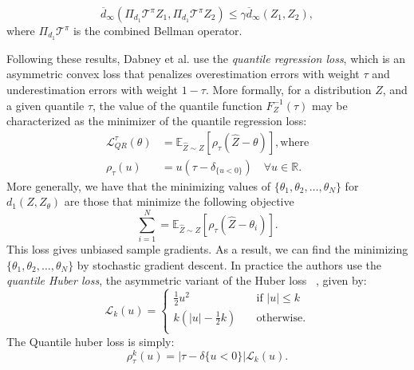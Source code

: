 \begin{equation}
\overline{d}_{\infty}(\Pi_{d_1} \mathcal{T}^\pi Z_1,\Pi_{d_1} \mathcal{T}^\pi Z_2) \leq \gamma \overline{d}_{\infty} (Z_1,Z_2),
\end{equation}
where $\Pi_{d_1} \mathcal{T}^\pi$ is the combined Bellman operator.\par
Following these results, Dabney et al. use the \emph{quantile regression loss}, which is an asymmetric convex loss that penalizes overestimation errors with weight $\tau$ and underestimation errors with weight $1-\tau$. More formally, for a distribution $Z$, and a given quantile $\tau$, the value of the quantile function $F_Z^{-1}(\tau)$ may be characterized as the minimizer of the quantile regression loss:
\begin{equation}
\begin{split}
\mathcal{L}_{QR}^{\tau}(\theta) & =\mathbb{E}_{\hat{Z} \sim Z}[\rho_{\tau}(\hat{Z}-\theta)], \text{where} \\
\rho_{\tau}(u) & = u(\tau- \delta_{\lbrace u<0 \rbrace}) \quad \forall u \in \mathbb{R}.
\end{split}
\label{eq:quantile_regression_loss}
\end{equation} 
More generally, we have that the minimizing values of $\lbrace \theta_1,\theta_2,\ldots,\theta_N\rbrace$ for $d_1(Z,Z_\theta)$ are those that minimize the following objective
\begin{equation*}
	\sum_{i=1}^{N} =\mathbb{E}_{\hat{Z} \sim Z}[\rho_{\tau}(\hat{Z}-\theta_i)].
\end{equation*}
This loss gives unbiased sample gradients. As a result, we can find the minimizing $\lbrace \theta_1,\theta_2,\ldots,\theta_N\rbrace$ by stochastic gradient descent. In practice the authors use the \emph{quantile Huber loss}, the asymmetric variant of the Huber loss ~\cite{huber:1964}, given by:
\begin{equation}
\mathcal{L}_k(u)=
		\begin{cases}
 \frac{1}{2}u^2 &\quad\text{if }\vert u \vert \leq k\\
 k(\vert u \vert - \frac{1}{2} k) &\quad\text{otherwise}. \\
 \end{cases}
\end{equation}
The Quantile huber loss is simply:
\begin{equation}
	\rho^k_\tau (u)=\vert \tau - \delta{\lbrace u<0 \rbrace} \vert \mathcal{L}_k(u).
\label{eq:quantile_huber_loss}
\end{equation}
